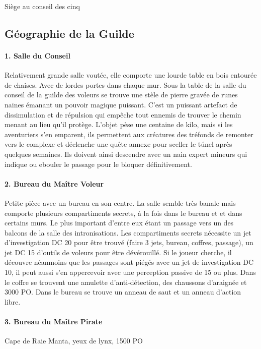 Siège au conseil des cinq

\subsection{Géographie de la Guilde}

\paragraph{1. Salle du Conseil} Relativement grande salle voutée, elle comporte une
lourde table en bois entourée de chaises. Avec de lordes portes dans chaque mur.
Sous la table de la salle du conseil de la guilde des voleurs se trouve une stèle
de pierre gravée de runes naines émanant un pouvoir magique puissant. C'est un 
puissant artefact de dissimulation et de répulsion qui empêche tout ennemis de 
trouver le chemin menant au lieu qu'il protège. L'objet pèse une centaine de kilo,
mais si les aventuriers s'en emparent, ils permettent aux créatures des tréfonds
de remonter vers le complexe et déclenche une quête annexe pour sceller le túnel
après quelques semaines. Ils doivent ainsi descendre avec un nain expert mineurs 
qui indique ou ebouler le passage pour le bloquer définitivement. 

\paragraph{2. Bureau du Maître Voleur} Petite pièce avec un bureau en son centre.
La salle semble très banale mais comporte plusieurs compartiments secrets, à la 
fois dans le bureau et et dans certains murs. Le plus important d'entre eux étant
un passage vers un des balcons de la salle des intronisations. Les compartiments
secrets nécessite un jet d'investigation DC 20 pour être trouvé (faire 3 jets, 
bureau, coffres, passage), un jet DC 15 d'outils de voleurs pour être dévérouillé.
Si le joueur cherche, il découvre néanmoins que les passages sont piégés avec un 
jet de investigation DC 10, il peut aussi s'en appercevoir avec une perception 
passive de 15 ou plus. Dans le coffre se trouvent une amulette d'anti-détection,
des chaussons d'araignée et 3000 PO. Dans le bureau se trouve un anneau de saut et
un anneau d'action libre.

\paragraph{3. Bureau du Maître Pirate}
Cape de Raie Manta, yeux de lynx, 1500 PO

